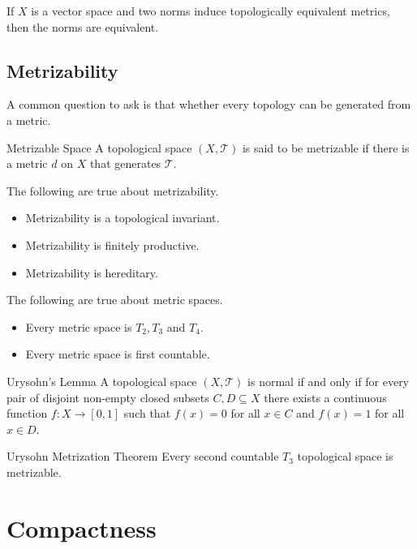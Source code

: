 \documentclass[a4paper]{article}
\begin{document}
\begin{lmm}{}{} If $X$ is a vector space and two norms induce topologically equivalent metrics, then the norms are equivalent. 
\end{lmm}

\subsection{Metrizability}
A common question to ask is that whether every topology can be generated from a metric. 
\begin{defn}{Metrizable Space}{} A topological space $(X,\mathcal{T})$ is said to be metrizable if there is a metric $d$ on $X$ that generates $\mathcal{T}$. 
\end{defn}

\begin{prp}{}{} The following are true about metrizability. 
\begin{itemize}
\item Metrizability is a topological invariant. 
\item Metrizability is finitely productive. 
\item Metrizability is hereditary. 
\end{itemize}
\end{prp}

\begin{prp}{}{} The following are true about metric spaces. 
\begin{itemize}
\item Every metric space is $T_2,T_3$ and $T_4$. 
\item Every metric space is first countable. 
\end{itemize}
\end{prp}

\begin{thm}{Urysohn's Lemma}{} A topological space $(X,\mathcal{T})$ is normal if and only if for every pair of disjoint non-empty closed subsets $C,D\subseteq X$ there exists a continuous function $f:X\to[0,1]$ such that $f(x)=0$ for all $x\in C$ and $f(x)=1$ for all $x\in D$. 
\end{thm}

\begin{thm}{Urysohn Metrization Theorem}{} Every second countable $T_3$ topological space is metrizable. 
\end{thm}

\pagebreak
\section{Compactness}
\end{document}
